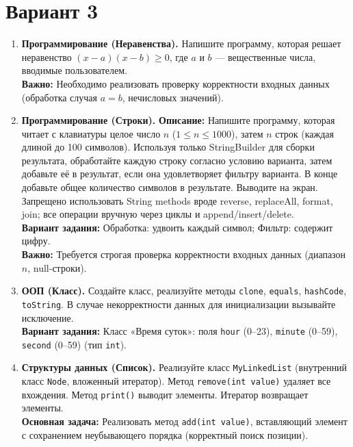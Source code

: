 \documentclass[10pt,a4paper]{article}
\begin{document}
\pagebreak

\section*{Вариант 3}

\begin{enumerate}
    \item \textbf{Программирование (Неравенства).} Напишите программу, которая решает неравенство $(x - a)(x - b) \geqslant 0$, где $a$ и $b$ — вещественные числа, вводимые пользователем. \\
    \textbf{Важно:} Необходимо реализовать проверку корректности входных данных (обработка случая $a = b$, нечисловых значений).
    
    \item \textbf{Программирование (Строки).} \textbf{Описание:} Напишите программу, которая читает с клавиатуры целое число $n$ ($1 \leq n \leq 1000$), затем $n$ строк (каждая длиной до 100 символов). Используя только StringBuilder для сборки результата, обработайте каждую строку согласно условию варианта, затем добавьте её в результат, если она удовлетворяет фильтру варианта. В конце добавьте общее количество символов в результате. Выводите на экран. Запрещено использовать String methods вроде reverse, replaceAll, format, join; все операции вручную через циклы и append/insert/delete. \\
    \textbf{Вариант задания:} Обработка: удвоить каждый символ; Фильтр: содержит цифру. \\
    \textbf{Важно:} Требуется строгая проверка корректности входных данных (диапазон $n$, null-строки).
    
    \item \textbf{ООП (Класс).} Создайте класс, реализуйте методы \texttt{clone}, \texttt{equals}, \texttt{hashCode}, \texttt{toString}. В случае некорректности данных для инициализации вызывайте исключение. \\
    \textbf{Вариант задания:} Класс «Время суток»: поля \texttt{hour} (0–23), \texttt{minute} (0–59), \texttt{second} (0–59) (тип \texttt{int}).
    
    \item \textbf{Структуры данных (Список).} Реализуйте класс \texttt{MyLinkedList} (внутренний класс \texttt{Node}, вложенный итератор). Метод \texttt{remove(int value)} удаляет все вхождения. Метод \texttt{print()} выводит элементы. Итератор возвращает элементы. \\
    \textbf{Основная задача:} Реализовать метод \texttt{add(int value)}, вставляющий элемент с сохранением неубывающего порядка (корректный поиск позиции).
\end{enumerate}
\end{document}
